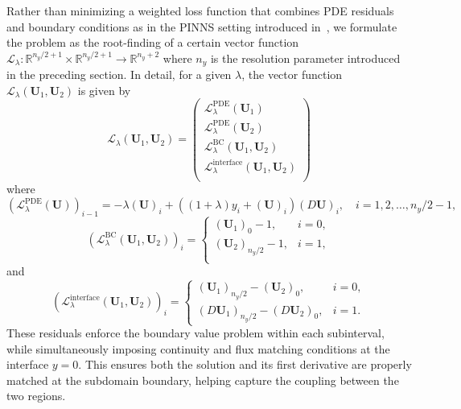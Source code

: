 \documentclass[12pt]{article}
\theoremstyle{definition}\newtheorem{lemma}{Lemma}
\begin{document}
Rather than minimizing a weighted loss function that combines PDE residuals and boundary conditions as in the PINNS setting introduced in~\cite{wang2023asymptotic}, we formulate the problem as the root-finding of a certain vector function $\mathcal{L}_\lambda: \mathbb{R}^{n_y/2+1} \times \mathbb{R}^{n_y/2+1} \to \mathbb{R}^{n_y+2}$ where $n_y$ is the resolution parameter introduced in the preceding section. In detail, for a given $\lambda$, the vector function $\mathcal{L}_\lambda(\mathbf{U}_1, \mathbf{U}_2)$ is given by 
\begin{equation}\label{eq:fixed_l_loss}
    \mathcal{L}_\lambda(\mathbf{U}_1, \mathbf{U}_2) = 
    \begin{pmatrix}
        \mathcal{L}^{\textrm{PDE}}_\lambda(\mathbf{U}_1)\\
        \mathcal{L}^{\textrm{PDE}}_\lambda(\mathbf{U}_2)\\
        \mathcal{L}^{\textrm{BC}}_\lambda(\mathbf{U}_1,\mathbf{U}_2)\\
        \mathcal{L}^{\textrm{interface}}_\lambda(\mathbf{U}_1, \mathbf{U}_2)\\
    \end{pmatrix}
\end{equation}
where
\begin{equation}
    (\mathcal{L}^{\textrm{PDE}}_\lambda(\mathbf{U}))_{i-1} = -\lambda (\mathbf{U})_i + ((1+\lambda)y_i + (\mathbf{U})_i)(D\mathbf{U})_i, \quad i = 1, 2, \ldots, n_y/2-1,
\end{equation}
\begin{equation}
    (\mathcal{L}^{\textrm{BC}}_\lambda(\mathbf{U}_1,\mathbf{U}_2))_{i} = 
    \begin{cases}
        (\mathbf{U}_1)_0 - 1, & i = 0, \\
        (\mathbf{U}_2)_{n_y/2} - 1, & i = 1, \\
    \end{cases}
\end{equation}
and
\begin{equation}
    (\mathcal{L}^{\textrm{interface}}_\lambda(\mathbf{U}_1, \mathbf{U}_2))_{i} = 
    \begin{cases}
        (\mathbf{U}_1)_{n_y/2} - (\mathbf{U}_2)_{0}, & i = 0, \\
        (D\mathbf{U}_1)_{n_y/2} - (D\mathbf{U}_2)_{0}, & i = 1.
    \end{cases}
\end{equation}
These residuals enforce the boundary value problem within each subinterval, while simultaneously imposing continuity and flux matching conditions at the interface $y = 0$. This ensures both the solution and its first derivative are properly matched at the subdomain boundary, helping capture the coupling between the two regions.
\end{document}
